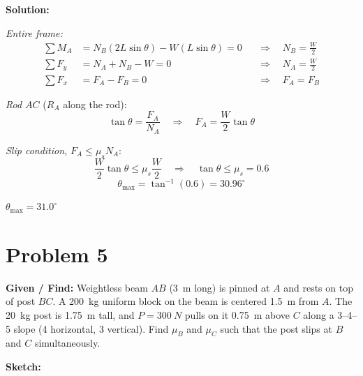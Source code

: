 \documentclass[11pt]{article}
\newcommand{\problem}[1]{\clearpage\section*{Problem #1}}
\begin{document}
\textbf{Solution:}

\textit{Entire frame:}
\begin{align*}
    \sum M_A &= N_B(2L\sin\theta) - W(L\sin\theta) = 0 &&\Rightarrow\quad N_B = \frac{W}{2} \\
    \sum F_y &= N_A + N_B - W = 0 &&\Rightarrow\quad N_A = \frac{W}{2} \\
    \sum F_x &= F_A - F_B = 0 &&\Rightarrow\quad F_A = F_B
\end{align*}

\textit{Rod $AC$} ($R_A$ along the rod):
\[
    \tan\theta = \frac{F_A}{N_A} \quad\Rightarrow\quad F_A = \frac{W}{2}\tan\theta
\]

\textit{Slip condition,} $F_A \le \mu_s N_A$:
\[
    \frac{W}{2}\tan\theta \le \mu_s\frac{W}{2} \quad\Rightarrow\quad \tan\theta \le \mu_s = 0.6
\]
\[
    \theta_{\max} = \tan^{-1}(0.6) = 30.96^\circ
\]

\begin{finalanswer}
    $\theta_{\max} = 31.0^\circ$
\end{finalanswer}

\problem{5}

\textbf{Given / Find:} Weightless beam $AB$ (\SI{3}{m} long) is pinned at $A$ and rests on top of post $BC$. A \SI{200}{kg} uniform block on the beam is centered \SI{1.5}{m} from $A$. The \SI{20}{kg} post is \SI{1.75}{m} tall, and $P = \SI{300}{N}$ pulls on it \SI{0.75}{m} above $C$ along a 3--4--5 slope (4 horizontal, 3 vertical). Find $\mu_B$ and $\mu_C$ such that the post slips at $B$ and $C$ simultaneously.

\textbf{Sketch:}
\end{document}
